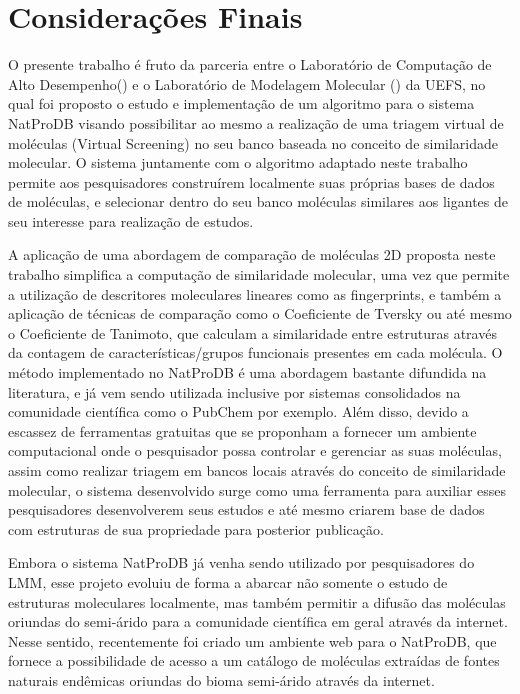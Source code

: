 \chapter{Considerações Finais}
\label{chap:conclusao}

O presente trabalho é fruto da parceria entre o Laboratório de Computação de Alto Desempenho() e o Laboratório de Modelagem Molecular () da UEFS, no qual foi proposto o estudo e implementação de um algoritmo para o sistema NatProDB visando possibilitar ao mesmo a realização de uma triagem virtual de moléculas (Virtual Screening) no seu banco baseada no conceito de similaridade molecular. O sistema juntamente com o algoritmo adaptado neste trabalho  permite aos pesquisadores construírem localmente suas próprias bases de dados de moléculas, e selecionar dentro do seu banco moléculas similares aos ligantes de seu interesse para realização de estudos. 

A aplicação de uma abordagem de comparação de moléculas 2D proposta neste trabalho simplifica  a computação de similaridade molecular, uma vez que permite a utilização de descritores moleculares lineares como as fingerprints, e também a aplicação de técnicas de comparação como o Coeficiente de Tversky ou até mesmo o Coeficiente de Tanimoto, que calculam a similaridade entre estruturas através da contagem de características/grupos funcionais presentes em cada molécula. 
O método implementado no NatProDB é uma abordagem bastante difundida na literatura, e já vem sendo utilizada inclusive por sistemas consolidados na comunidade científica como o PubChem por exemplo. Além disso, devido a escassez de ferramentas gratuitas que se proponham a fornecer um ambiente computacional onde o pesquisador possa controlar e gerenciar as suas moléculas, assim como realizar triagem em bancos locais através do conceito de similaridade molecular, o sistema desenvolvido surge como uma ferramenta para auxiliar esses pesquisadores desenvolverem seus estudos e até mesmo criarem  base de dados com estruturas de sua propriedade para posterior publicação.

Embora o sistema NatProDB já venha sendo utilizado por pesquisadores do LMM, esse projeto evoluiu de forma a abarcar não somente o estudo de estruturas moleculares localmente, mas também permitir a difusão das moléculas oriundas do semi-árido para a comunidade científica em geral através da internet. Nesse sentido, recentemente foi criado um ambiente web para o NatProDB, que fornece a possibilidade de acesso a um catálogo de moléculas extraídas de fontes naturais endêmicas oriundas do bioma semi-árido através da internet.

